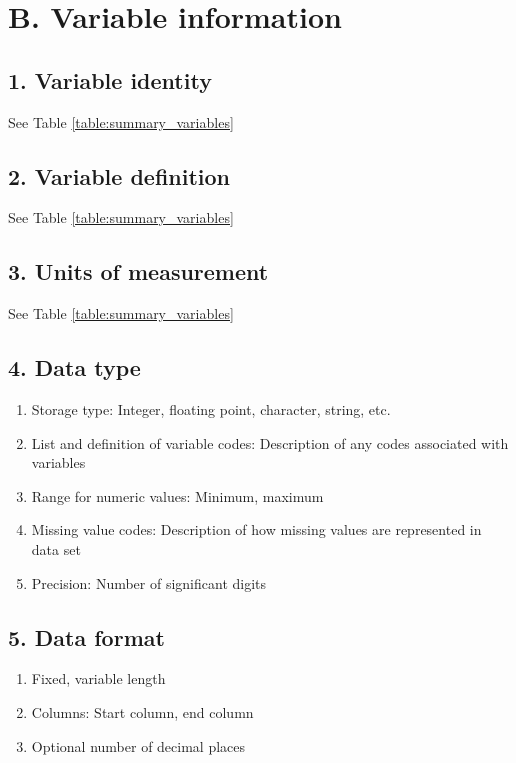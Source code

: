 \documentclass[a4paper,twoside,12pt]{article}
\begin{document}
    \section*{B. Variable information}
    		\subsection*{1. Variable identity} See Table \ref{table:summary_variables}
        \subsection*{2. Variable definition} See Table \ref{table:summary_variables}
        \subsection*{3. Units of measurement} See Table \ref{table:summary_variables}
        
        
       
        
        \subsection*{4. Data type}
        		\begin{enumerate}[label=\alph*.]
            		\item Storage type: Integer, floating point, character, string, etc.
            		\item List and definition of variable codes: Description of any codes associated with variables
            		\item Range for numeric values: Minimum, maximum
            		\item Missing value codes: Description of how missing values are represented in data set
            		\item Precision: Number of significant digits
            \end{enumerate}
            
            
        \subsection*{5. Data format}
        		\begin{enumerate}[label=\alph*.]
        			\item Fixed, variable length
            		\item Columns: Start column, end column
            		\item Optional number of decimal places
        		\end{enumerate}
\end{document}
